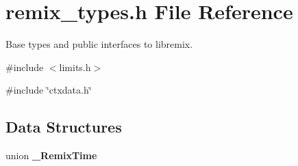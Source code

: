 \section{remix\_\-types.h File Reference}
\label{remix__types_8h}


Base types and public interfaces to libremix.  


{\ttfamily \#include $<$limits.h$>$}\par
{\ttfamily \#include \char`\"{}ctxdata.h\char`\"{}}\par
\subsection*{Data Structures}
\begin{DoxyCompactItemize}
\item 
union {\bf \_\-RemixTime}
\end{DoxyCompactItemize}
